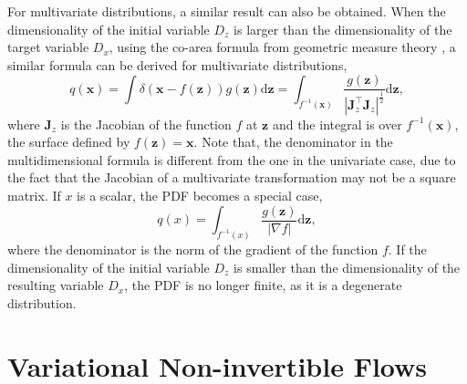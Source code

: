\documentclass[twoside]{article}
\newcommand{\xV}{\mathbf{x}}
\newcommand{\zV}{\mathbf{z}}
\newcommand{\diff}{\text{d}}
\newcommand{\J}{\mathbf{J}}
\begin{document}
For multivariate distributions, a similar result can also be obtained. When the dimensionality of the initial variable $D_z$ is larger than the dimensionality of the target variable $D_x$, using the co-area formula from geometric measure theory \citep{Federer1969}, a similar formula can be derived for multivariate distributions,
\begin{equation}
q(\xV)  = \int \delta\left(\xV - f(\zV)\right) g(\zV) \diff \zV=  \int_{f^{-1}(\xV)}  \frac{g(\zV)}{\left|\J_z^\top\J_z\right|^{\frac{1}{2}}}  \diff \zV,
\end{equation}
where $\J_z$ is the Jacobian of the function $f$ at $\zV$ and the integral is over $f^{-1}(\xV)$, the surface defined by $f(\zV) = \xV$. Note that, the denominator in the multidimensional formula is different from the one in the univariate case, due to the fact that the Jacobian of a multivariate transformation may not be a square matrix. If $x$ is a scalar, the PDF becomes a special case,
\begin{equation}
q(x)  =  \int_{f^{-1}(x)}  \frac{g(\zV)}{\left|\nabla f\right|}  \diff \zV,
\end{equation}
where the denominator is the norm of the gradient of the function $f$. If the dimensionality of the initial variable $D_z$ is smaller than the dimensionality of the resulting variable $D_x$, the PDF is no longer finite, as it is a degenerate distribution.



\section{Variational Non-invertible Flows}
\end{document}
